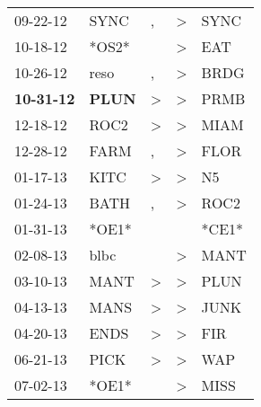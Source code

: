 \begin{supertabular}{p{0.07\textwidth}p{0.06\textwidth}p{0.02\textwidth}p{0.02\textwidth}p{0.06\textwidth}}
          09-22-12\textsuperscript{} &           SYNC\textsuperscript{} &                , &  \textgreater &           SYNC\textsuperscript{} \\
          10-18-12\textsuperscript{} &                            *OS2* &                  &  \textgreater &            EAT\textsuperscript{} \\
          10-26-12\textsuperscript{} &           reso\textsuperscript{} &                , &  \textgreater &           BRDG\textsuperscript{} \\
 \textbf{10-31-12\textsuperscript{}} &  \textbf{PLUN\textsuperscript{}} &     \textgreater &  \textgreater &           PRMB\textsuperscript{} \\
          12-18-12\textsuperscript{} &           ROC2\textsuperscript{} &     \textgreater &  \textgreater &           MIAM\textsuperscript{} \\
          12-28-12\textsuperscript{} &           FARM\textsuperscript{} &                , &  \textgreater &           FLOR\textsuperscript{} \\
          01-17-13\textsuperscript{} &           KITC\textsuperscript{} &     \textgreater &  \textgreater &             N5\textsuperscript{} \\
          01-24-13\textsuperscript{} &           BATH\textsuperscript{} &                , &  \textgreater &           ROC2\textsuperscript{} \\
          01-31-13\textsuperscript{} &                            *OE1* &                  &               &                            *CE1* \\
          02-08-13\textsuperscript{} &           blbc\textsuperscript{} &                  &  \textgreater &           MANT\textsuperscript{} \\
          03-10-13\textsuperscript{} &           MANT\textsuperscript{} &     \textgreater &  \textgreater &           PLUN\textsuperscript{} \\
          04-13-13\textsuperscript{} &           MANS\textsuperscript{} &     \textgreater &  \textgreater &           JUNK\textsuperscript{} \\
          04-20-13\textsuperscript{} &           ENDS\textsuperscript{} &     \textgreater &  \textgreater &            FIR\textsuperscript{} \\
          06-21-13\textsuperscript{} &           PICK\textsuperscript{} &     \textgreater &  \textgreater &            WAP\textsuperscript{} \\
          07-02-13\textsuperscript{} &                            *OE1* &                  &  \textgreater &           MISS\textsuperscript{} \\

\end{supertabular}
